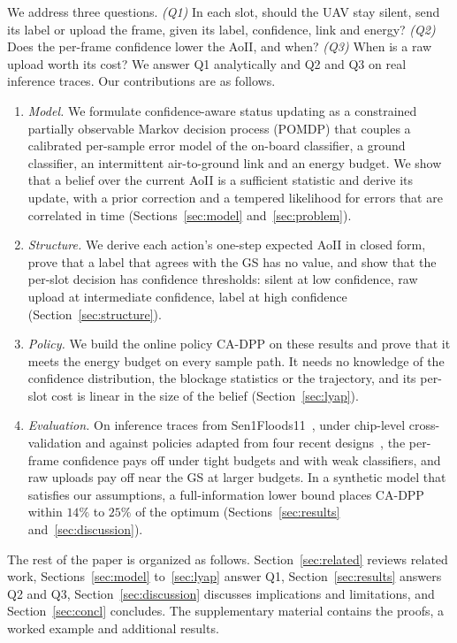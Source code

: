 \documentclass[10pt,journal,compsoc]{IEEEtran}
\theoremstyle{remark}
\begin{document}
We address three questions. \emph{(Q1)} In each slot, should the UAV stay silent, send its label or upload the frame, given its label, confidence, link and energy? \emph{(Q2)} Does the per-frame confidence lower the AoII, and when? \emph{(Q3)} When is a raw upload worth its cost? We answer Q1 analytically and Q2 and Q3 on real inference traces. Our contributions are as follows.
\begin{enumerate}
\item \emph{Model.} We formulate confidence-aware status updating as a constrained partially observable Markov decision process (POMDP) that couples a calibrated per-sample error model of the on-board classifier, a ground classifier, an intermittent air-to-ground link and an energy budget. We show that a belief over the current AoII is a sufficient statistic and derive its update, with a prior correction and a tempered likelihood for errors that are correlated in time (Sections~\ref{sec:model} and~\ref{sec:problem}).
\item \emph{Structure.} We derive each action's one-step expected AoII in closed form, prove that a label that agrees with the GS has no value, and show that the per-slot decision has confidence thresholds: silent at low confidence, raw upload at intermediate confidence, label at high confidence (Section~\ref{sec:structure}).
\item \emph{Policy.} We build the online policy CA-DPP on these results and prove that it meets the energy budget on every sample path. It needs no knowledge of the confidence distribution, the blockage statistics or the trajectory, and its per-slot cost is linear in the size of the belief (Section~\ref{sec:lyap}).
\item \emph{Evaluation.} On inference traces from Sen1Floods11~\cite{bonafilia2020sen1floods11}, under chip-level cross-validation and against policies adapted from four recent designs~\cite{zakeri2023aoiieh,gan2025taoi,pehlivanoglu2026orbit,basnayaka2025aomi}, the per-frame confidence pays off under tight budgets and with weak classifiers, and raw uploads pay off near the GS at larger budgets. In a synthetic model that satisfies our assumptions, a full-information lower bound places CA-DPP within $14\%$ to $25\%$ of the optimum (Sections~\ref{sec:results} and~\ref{sec:discussion}).
\end{enumerate}

The rest of the paper is organized as follows. Section~\ref{sec:related} reviews related work, Sections~\ref{sec:model} to~\ref{sec:lyap} answer Q1, Section~\ref{sec:results} answers Q2 and Q3, Section~\ref{sec:discussion} discusses implications and limitations, and Section~\ref{sec:concl} concludes. The supplementary material contains the proofs, a worked example and additional results.
\end{document}
